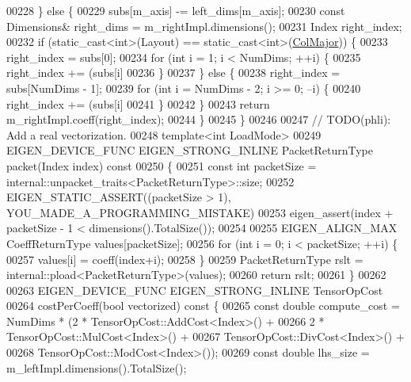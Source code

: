 \begin{DoxyCode}
00228     \} \textcolor{keywordflow}{else} \{
00229       subs[m\_axis] -= left\_dims[m\_axis];
00230       \textcolor{keyword}{const} Dimensions& right\_dims = m\_rightImpl.dimensions();
00231       Index right\_index;
00232       \textcolor{keywordflow}{if} (static\_cast<int>(Layout) == static\_cast<int>(\hyperlink{group__enums_ggaacded1a18ae58b0f554751f6cdf9eb13a0cbd4bdd0abcfc0224c5fcb5e4f6669a}{ColMajor})) \{
00233         right\_index = subs[0];
00234         \textcolor{keywordflow}{for} (\textcolor{keywordtype}{int} i = 1; i < NumDims; ++i) \{
00235           right\_index += (subs[i] %
00236         \}
00237       \} \textcolor{keywordflow}{else} \{
00238         right\_index = subs[NumDims - 1];
00239         \textcolor{keywordflow}{for} (\textcolor{keywordtype}{int} i = NumDims - 2; i >= 0; --i) \{
00240           right\_index += (subs[i] %
00241         \}
00242       \}
00243       \textcolor{keywordflow}{return} m\_rightImpl.coeff(right\_index);
00244     \}
00245   \}
00246 
00247   \textcolor{comment}{// TODO(phli): Add a real vectorization.}
00248   \textcolor{keyword}{template}<\textcolor{keywordtype}{int} LoadMode>
00249   EIGEN\_DEVICE\_FUNC EIGEN\_STRONG\_INLINE PacketReturnType packet(Index index)\textcolor{keyword}{ const}
00250 \textcolor{keyword}{  }\{
00251     \textcolor{keyword}{const} \textcolor{keywordtype}{int} packetSize = internal::unpacket\_traits<PacketReturnType>::size;
00252     EIGEN\_STATIC\_ASSERT((packetSize > 1), YOU\_MADE\_A\_PROGRAMMING\_MISTAKE)
00253     eigen\_assert(index + packetSize - 1 < dimensions().TotalSize());
00254 
00255     EIGEN\_ALIGN\_MAX CoeffReturnType values[packetSize];
00256     \textcolor{keywordflow}{for} (\textcolor{keywordtype}{int} i = 0; i < packetSize; ++i) \{
00257       values[i] = coeff(index+i);
00258     \}
00259     PacketReturnType rslt = internal::pload<PacketReturnType>(values);
00260     \textcolor{keywordflow}{return} rslt;
00261   \}
00262 
00263   EIGEN\_DEVICE\_FUNC EIGEN\_STRONG\_INLINE TensorOpCost
00264   costPerCoeff(\textcolor{keywordtype}{bool} vectorized)\textcolor{keyword}{ const }\{
00265     \textcolor{keyword}{const} \textcolor{keywordtype}{double} compute\_cost = NumDims * (2 * TensorOpCost::AddCost<Index>() +
00266                                            2 * TensorOpCost::MulCost<Index>() +
00267                                            TensorOpCost::DivCost<Index>() +
00268                                            TensorOpCost::ModCost<Index>());
00269     \textcolor{keyword}{const} \textcolor{keywordtype}{double} lhs\_size = m\_leftImpl.dimensions().TotalSize();

\end{DoxyCode}
